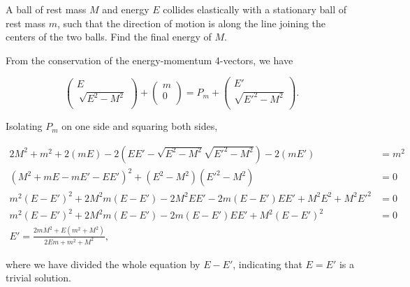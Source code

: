 \documentclass[english,a4paper,12pt]{report}
\begin{document}
{A ball of rest mass \(M\) and energy \(E\) collides elastically with a stationary ball of rest mass \(m\), such that the direction of motion is along the line joining the centers of the two balls. Find the final energy of \(M\).}
{From the conservation of the energy-momentum 4-vectors, we have

\begin{equation}
    \begin{pmatrix}
         E\\\
         \sqrt{E^2-M^2}  \\
    \end{pmatrix} + \begin{pmatrix}
         m \\
         0 \\
    \end{pmatrix} = P_{m} + \begin{pmatrix}
         E' \\
         \sqrt{E'^2-M^2}  \\
    \end{pmatrix}.
\end{equation}

Isolating \(P_{m} \) on one side and squaring both sides, 

\begin{equation}
    \begin{aligned} 
    2M^2 + m^2 + 2(mE) - 2 (EE' - \sqrt{E^2-M^2}\sqrt{E'^2-M^2}  ) -2(mE') &= m^2 \\
    (M^2 + mE - mE' - EE')^2 +(E^2-M^2)(E'^2-M^2) &=0  \\
    m^2 (E-E')^2 + 2M^2m(E-E') - 2M^2EE' - 2m(E-E')EE' + M^2E^2 + M^2E'^2 &=0 \\ 
    m^2(E-E')^2 + 2M^2m(E-E') - 2m(E-E')EE' +M^2(E-E')^2 &= 0\\
    E' = \frac{2mM^2+E(m^2+M^2)}{2Em+m^2+M^2}, 
    \end{aligned} 
\end{equation}

where we have divided the whole equation by \(E-E'\), indicating that \(E= E'\) is a trivial solution. 
} 
\end{document}
